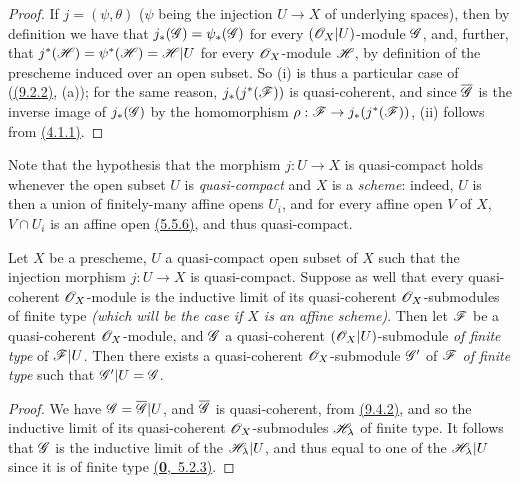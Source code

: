 \begin{proof}
\label{proof-prop-1.9.4.2}
If $j=(\psi,\theta)$ ($\psi$ being the injection $U\to X$ of underlying spaces), then by
definition we have that $j_*(\mathscr{G})=\psi_*(\mathscr{G})$ for every $(\mathscr{O}_X|U)$-module $\mathscr{G}$,
and, further, that $j^*(\mathscr{H})=\psi^*(\mathscr{H})=\mathscr{H}|U$ for every $\mathscr{O}_X$-module $\mathscr{H}$,
by definition of the prescheme induced over an open subset. So (i) is thus a particular case
of (\hyperref[cor-1.9.2.2]{(9.2.2)}, (a)); for the same reason, $j_*(j^*(\mathscr{F}))$ is quasi-coherent, and
since $\overline{\mathscr{G}}$ is the inverse image of $j_*(\mathscr{G})$ by the homomorphism
$\rho:\mathscr{F}\to j_*(j^*(\mathscr{F}))$, (ii) follows from \hyperref[env-1.4.1.1]{(4.1.1)}.
\end{proof}

Note that the hypothesis that the morphism $j:U\to X$ is quasi-compact
holds whenever the open subset $U$ is {\it quasi-compact} and $X$ is a
{\it scheme}: indeed, $U$ is then a union of finitely-many affine opens $U_i$,
and for every affine open $V$ of $X$, $V\cap U_i$ is an affine open \hyperref[env-1.5.5.6]{(5.5.6)}, and
thus quasi-compact.

\begin{cor}[9.4.3]
\label{cor-1.9.4.3}
Let $X$ be a prescheme, $U$ a quasi-compact open subset of $X$ such that the injection
morphism $j:U\to X$ is quasi-compact. Suppose as well that every quasi-coherent
$\mathscr{O}_X$-module is the inductive limit of its quasi-coherent $\mathscr{O}_X$-submodules of finite type
{\it (which will be the case if $X$ is an {\it affine scheme})}. Then let $\mathscr{F}$ be a
quasi-coherent $\mathscr{O}_X$-module, and $\mathscr{G}$ a quasi-coherent $(\mathscr{O}_X|U)$-submodule {\it of
finite type} of $\mathscr{F}|U$. Then there exists a quasi-coherent $\mathscr{O}_X$-submodule $\mathscr{G}'$ of
$\mathscr{F}$ {\it of finite type} such that $\mathscr{G}'|U=\mathscr{G}$.
\end{cor}

\begin{proof}
\label{proof-cor-1.9.4.3}
We have $\mathscr{G}=\overline{\mathscr{G}}|U$, and $\overline{\mathscr{G}}$ is quasi-coherent, from
\hyperref[prop-1.9.4.2]{(9.4.2)}, and so the inductive limit of its quasi-coherent $\mathscr{O}_X$-submodules
$\mathscr{H}_\lambda$ of finite type. It follows that $\mathscr{G}$ is the inductive limit of the
$\mathscr{H}_\lambda|U$, and thus equal to one of the $\mathscr{H}_\lambda|U$ since it is of finite
type \hyperref[env-0.5.2.3]{(\textbf{0},~5.2.3)}.
\end{proof}

